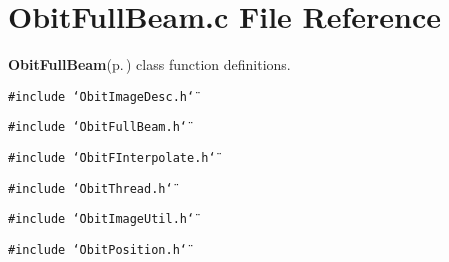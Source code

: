 \section{Obit\-Full\-Beam.c File Reference}
\label{ObitFullBeam_8c}
{\bf Obit\-Full\-Beam}{\rm (p.\,\pageref{structObitFullBeam})} class function definitions. 

{\tt \#include \char`\"{}Obit\-Image\-Desc.h\char`\"{}}\par
{\tt \#include \char`\"{}Obit\-Full\-Beam.h\char`\"{}}\par
{\tt \#include \char`\"{}Obit\-FInterpolate.h\char`\"{}}\par
{\tt \#include \char`\"{}Obit\-Thread.h\char`\"{}}\par
{\tt \#include \char`\"{}Obit\-Image\-Util.h\char`\"{}}\par
{\tt \#include \char`\"{}Obit\-Position.h\char`\"{}}\par
